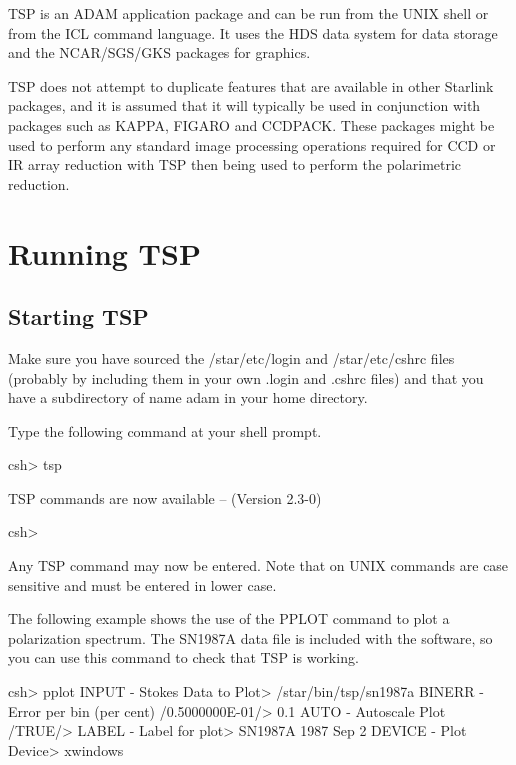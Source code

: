 \documentclass[11pt,twoside,nolof,noabs]{starlink}
\begin{document}
TSP is an ADAM application package and can be run from the UNIX shell or
from the ICL command language.
It uses the HDS data system for data storage and the NCAR/SGS/GKS packages
for graphics.

TSP does not attempt to duplicate features that are available in other Starlink
packages, and it is assumed that it will typically be used in conjunction with packages such as KAPPA, FIGARO and CCDPACK. These packages might be used to perform any standard image processing operations required for CCD or IR array
reduction with TSP then being used to perform the polarimetric reduction.

\section{Running TSP}

\subsection{Starting TSP}

Make sure you have sourced the /star/etc/login and /star/etc/cshrc files (probably by including them in your own .login and .cshrc files) and that you have a subdirectory of name adam in your home directory.

Type the following command at your shell prompt.

\begin{terminalv}

  csh> tsp

    TSP commands are now available -- (Version 2.3-0)

  csh>
\end{terminalv}

Any TSP command may now be entered. Note that on UNIX commands are case sensitive and must be entered in lower case.

The following example shows the use of the
PPLOT command to plot a polarization spectrum. The SN1987A data file is
included with the software, so you can use this command to check that TSP
is working.

\begin{terminalv}

    csh> pplot
    INPUT - Stokes Data to Plot> /star/bin/tsp/sn1987a
    BINERR - Error per bin (per cent) /0.5000000E-01/> 0.1
    AUTO - Autoscale Plot /TRUE/>
    LABEL - Label for plot> SN1987A  1987 Sep 2
    DEVICE - Plot Device> xwindows

\end{terminalv}
\end{document}
